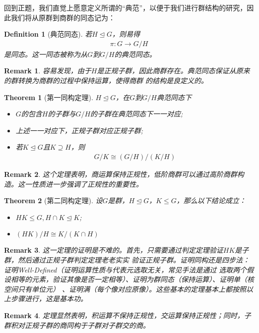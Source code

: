 \documentclass[12pt,a4paper,UTF8]{ctexbook}
\theoremstyle{plain}
\newtheorem{theorem}{\indent Theorem}[section]
\newtheorem{definition}{\indent Definition}[section]
\newtheorem{remark}{\indent Remark}[section]
\begin{document}
回到正题，我们直觉上愿意定义所谓的“典范”，以便于我们进行群结构的研究，因此我们将从原群到商群的同态记为：
\begin{definition}[典范同态]
    若$H\trianglelefteq G$，则易得
    \begin{align*} 
    \pi:G \to G/H
    \end{align*}
    是同态。这一同态被称为从$G$到$G/H$的典范同态。
\end{definition}
\begin{remark}
    容易发现，由于$H$是正规子群，因此商群存在。典范同态保证从原来的群转换为商群的过程中保持运算，使得商群
    的结构是良定义的。
\end{remark}
\begin{theorem}[第一同构定理]
$H\trianglelefteq G$，在$G$到$G/H$典范同态下
\begin{itemize}
        \item $G$的包含$H$的子群与$G/H$的子群在典范同态下一一对应;
        \item 上述一一对应下，正规子群对应正规子群;
        \item 若$K\trianglelefteq G$且$K\supseteq H$，则
              \begin{align*} 
                G/K \cong (G/H)/(K/H)
              \end{align*}
\end{itemize}
\end{theorem}
\begin{remark}
    这个定理表明，商运算保持正规性，低阶商群可以通过高阶商群构造。这一性质进一步强调了正规性的重要性。
\end{remark}

\begin{theorem}[第二同构定理]
    设$G$是群，$H\trianglelefteq G$，$K\leq G$，那么以下结论成立：
    \begin{itemize}
        \item $HK\leq G, H\cap K \trianglelefteq K$;
        \item $(HK)/H\cong K/(K\cap H)$
    \end{itemize}
\end{theorem}
\begin{remark}
    这一定理的证明是不难的。首先，只需要通过判定定理验证$HK$是子群，然后通过正规子群判定定理老老实实
    验证正规子群。证明同构还是四步法：证明Well-Defined（证明运算性质与代表元选取无关，常见手法是通过
    选取两个假设相等的元素，验证其像是否一定相等）、证明为群同态（保持运算）、证明单（核空间只有单位元）
    、证明满（每个像对应原像）。这些基本的定理基本上都按照以上步骤进行，这是基本功。
\end{remark}
\begin{remark}
    定理显然表明，积运算不保持正规性，交运算保持正规性；同时，子群积对正规子群的商同构于子群对子群交的商。
\end{remark}
\end{document}
